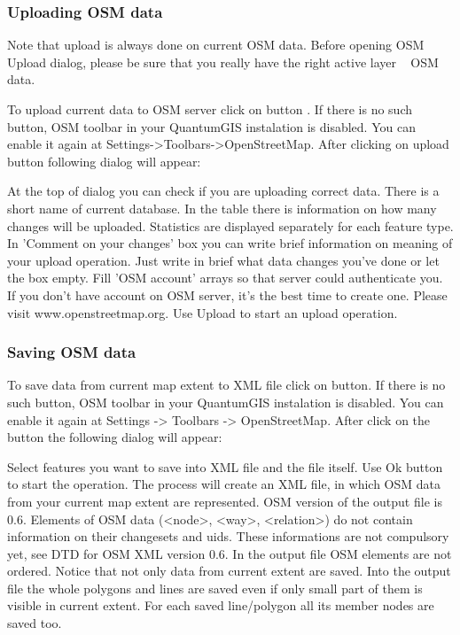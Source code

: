 \subsubsection{Uploading OSM data}  

Note that upload is always done on current OSM data. Before opening OSM
Upload dialog, please be sure that you really have the right active layer ~
OSM data.

To upload current data to OSM server click on  button   .
If there is no such button, OSM toolbar in your QuantumGIS instalation is
disabled. You can enable it again at Settings->Toolbars->OpenStreetMap.
After clicking on upload button following dialog will appear:

At the top of dialog you can check if you are uploading correct data. There
is a short name of current database. In the table there is information on how
many changes will be uploaded. Statistics are displayed separately for each
feature type.
In 'Comment on your changes' box you can write brief information on meaning
of your upload operation. Just write in brief what data changes you've done
or let the box empty.
Fill 'OSM account' arrays so that server could authenticate you. If you don't
have account on OSM server, it's the best time to create one. Please visit
www.openstreetmap.org.
Use Upload to start an upload operation.

\subsubsection{Saving OSM data}  

To save data from current map extent to XML file click on 
 button.
If there is no such button, OSM toolbar in your QuantumGIS instalation is
disabled. You can enable it again at Settings -> Toolbars -> OpenStreetMap.
After click on the button the following dialog will appear:

Select features you want to save into XML file and the file itself.
Use Ok button to start the operation.
The process will create an XML file, in which OSM data from your current map
extent are represented. OSM version of the output file is 0.6. Elements of
OSM data (<node>, <way>, <relation>) do not contain information on their
changesets and uids. These informations are not compulsory yet, see DTD for
OSM XML version 0.6.
In the output file OSM elements are not ordered.
Notice that not only data from current extent are saved. Into the output file
the whole polygons and lines are saved even if only small part of them is
visible in current extent. For each saved line/polygon all its member nodes
are saved too.

